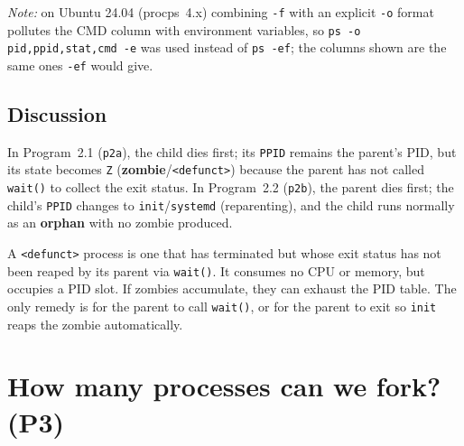 \documentclass[11pt,a4paper]{article}
\begin{document}
\noindent\textit{Note:} on Ubuntu 24.04 (procps~4.x) combining \texttt{-f} with an explicit \texttt{-o} format pollutes the CMD column with environment variables, so \texttt{ps -o pid,ppid,stat,cmd -e} was used instead of \texttt{ps -ef}; the columns shown are the same ones \texttt{-ef} would give.

\subsection*{Discussion}

In Program~2.1 (\texttt{p2a}), the child dies first; its \texttt{PPID} remains the parent's PID, but its state becomes \texttt{Z} (\textbf{zombie}/\texttt{<defunct>}) because the parent has not called \texttt{wait()} to collect the exit status. In Program~2.2 (\texttt{p2b}), the parent dies first; the child's \texttt{PPID} changes to \texttt{init}/\texttt{systemd} (reparenting), and the child runs normally as an \textbf{orphan} with no zombie produced.

A \texttt{<defunct>} process is one that has terminated but whose exit status has not been reaped by its parent via \texttt{wait()}. It consumes no CPU or memory, but occupies a PID slot. If zombies accumulate, they can exhaust the PID table. The only remedy is for the parent to call \texttt{wait()}, or for the parent to exit so \texttt{init} reaps the zombie automatically.

\newpage

\section{How many processes can we fork? (P3)}
\end{document}
